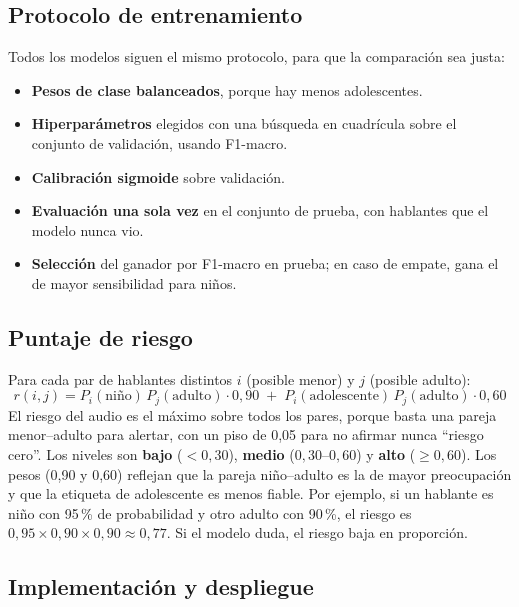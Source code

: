 \documentclass[11pt,a4paper]{article}
\begin{document}
\subsection{Protocolo de entrenamiento}

Todos los modelos siguen el mismo protocolo, para que la comparación sea justa:
\begin{itemize}
  \item \textbf{Pesos de clase balanceados}, porque hay menos adolescentes.
  \item \textbf{Hiperparámetros} elegidos con una búsqueda en cuadrícula sobre el conjunto de validación, usando F1-macro.
  \item \textbf{Calibración sigmoide} sobre validación.
  \item \textbf{Evaluación una sola vez} en el conjunto de prueba, con hablantes que el modelo nunca vio.
  \item \textbf{Selección} del ganador por F1-macro en prueba; en caso de empate, gana el de mayor sensibilidad para niños.
\end{itemize}

\subsection{Puntaje de riesgo}
\label{sec:riesgo}

Para cada par de hablantes distintos $i$ (posible menor) y $j$ (posible adulto):
\begin{equation}
r(i,j) = P_i(\text{niño})\,P_j(\text{adulto}) \cdot 0{,}90 \;+\; P_i(\text{adolescente})\,P_j(\text{adulto}) \cdot 0{,}60
\end{equation}
El riesgo del audio es el máximo sobre todos los pares, porque basta una pareja menor--adulto para alertar, con un piso de 0,05 para no afirmar nunca ``riesgo cero''. Los niveles son \textbf{bajo} ($<0{,}30$), \textbf{medio} ($0{,}30$--$0{,}60$) y \textbf{alto} ($\geq 0{,}60$). Los pesos (0,90 y 0,60) reflejan que la pareja niño--adulto es la de mayor preocupación y que la etiqueta de adolescente es menos fiable. Por ejemplo, si un hablante es niño con 95\,\% de probabilidad y otro adulto con 90\,\%, el riesgo es $0{,}95 \times 0{,}90 \times 0{,}90 \approx 0{,}77$. Si el modelo duda, el riesgo baja en proporción.

\subsection{Implementación y despliegue}
\end{document}
